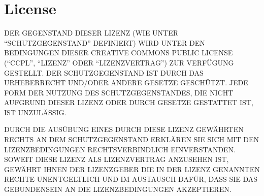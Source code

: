 

\chapter{License}
\label{ch:license}

DER GEGENSTAND DIESER LIZENZ (WIE UNTER ``SCHUTZGEGENSTAND'' DEFINIERT) WIRD UNTER DEN BEDINGUNGEN DIESER CREATIVE COMMONS PUBLIC LICENSE (``CCPL'', ``LIZENZ'' ODER ``LIZENZVERTRAG'') ZUR VERFÜGUNG GESTELLT. DER SCHUTZGEGENSTAND IST DURCH DAS URHEBERRECHT UND/ODER ANDERE GESETZE GESCHÜTZT. JEDE FORM DER NUTZUNG DES SCHUTZGEGENSTANDES, DIE NICHT AUFGRUND DIESER LIZENZ ODER DURCH GESETZE GESTATTET IST, IST UNZULÄSSIG.

DURCH DIE AUSÜBUNG EINES DURCH DIESE LIZENZ GEWÄHRTEN RECHTS AN DEM SCHUTZGEGENSTAND ERKLÄREN SIE SICH MIT DEN LIZENZBEDINGUNGEN RECHTSVERBINDLICH EINVERSTANDEN. SOWEIT DIESE LIZENZ ALS LIZENZVERTRAG ANZUSEHEN IST, GEWÄHRT IHNEN DER LIZENZGEBER DIE IN DER LIZENZ GENANNTEN RECHTE UNENTGELTLICH UND IM AUSTAUSCH DAFÜR, DASS SIE DAS GEBUNDENSEIN AN DIE LIZENZBEDINGUNGEN AKZEPTIEREN.


